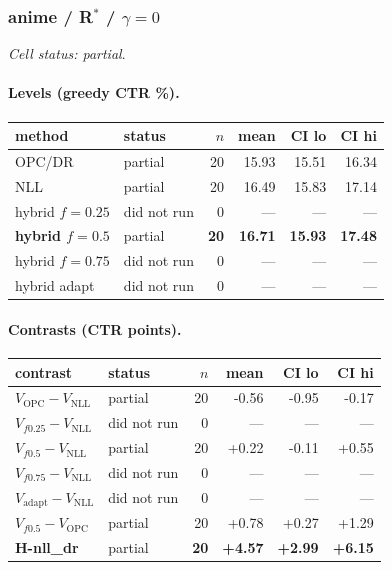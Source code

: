 \documentclass[10pt,a4paper]{article}
\begin{document}
\subsubsection{anime / R$^*$ / $\gamma=0$}
\emph{Cell status: partial}.
\paragraph{Levels (greedy CTR \%).}
{\centering\small\begin{tabular}{llrrrr}
\toprule method & status & $n$ & mean & CI lo & CI hi \\
\midrule
OPC/DR & partial & 20 & 15.93 & 15.51 & 16.34 \\
NLL & partial & 20 & 16.49 & 15.83 & 17.14 \\
hybrid $f{=}0.25$ & did not run & 0 & --- & --- & --- \\
\textbf{hybrid $f{=}0.5$} & partial & \textbf{20} & \textbf{16.71} & \textbf{15.93} & \textbf{17.48} \\
hybrid $f{=}0.75$ & did not run & 0 & --- & --- & --- \\
hybrid adapt & did not run & 0 & --- & --- & --- \\
\bottomrule\end{tabular}\par}
\paragraph{Contrasts (CTR points).}
{\centering\small\begin{tabular}{llrrrr}
\toprule contrast & status & $n$ & mean & CI lo & CI hi \\
\midrule
$V_{\mathrm{OPC}}-V_{\mathrm{NLL}}$ & partial & 20 & -0.56 & -0.95 & -0.17 \\
$V_{f0.25}-V_{\mathrm{NLL}}$ & did not run & 0 & --- & --- & --- \\
$V_{f0.5}-V_{\mathrm{NLL}}$ & partial & 20 & +0.22 & -0.11 & +0.55 \\
$V_{f0.75}-V_{\mathrm{NLL}}$ & did not run & 0 & --- & --- & --- \\
$V_{\mathrm{adapt}}-V_{\mathrm{NLL}}$ & did not run & 0 & --- & --- & --- \\
$V_{f0.5}-V_{\mathrm{OPC}}$ & partial & 20 & +0.78 & +0.27 & +1.29 \\
\textbf{H-nll\_dr} & partial & \textbf{20} & \textbf{+4.57} & \textbf{+2.99} & \textbf{+6.15} \\
\bottomrule\end{tabular}\par}
\bigskip
\end{document}
